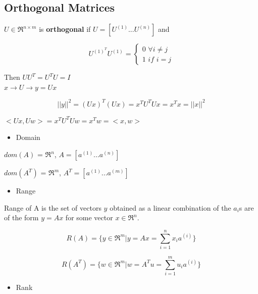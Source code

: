 \subsection{Orthogonal Matrices}

\begin{definition}
	$U\in \Re^{n\times m}$ is \textbf{orthogonal} if $U = [U^{(1)} ... U^{(n)}]$
	and 
	
	$$ U^{(1)^T}U^{(1)}=\left\{
	\begin{aligned}
	0\,\, \forall i\neq j \\
	1\,\, if \,\, i = j
	\end{aligned}
	\right.
	$$
\end{definition}

Then $UU^T = U^TU = I$\\


$x\rightarrow U \rightarrow y = Ux$

\begin{equation*}
||y||^2 = (Ux)^T(Ux) = x^TU^TUx = x^Tx = ||x||^2
\end{equation*}

$<Ux, Uw> = x^TU^TUw = x^Tw = <x, w>$

\begin{itemize}
	\item Domain
\end{itemize}

$dom(A)$ = $\Re^n$, $A = [a^{(1)}...a^{(n)}]$

$dom(A^T)$ = $\Re^m$, $A^T = [a^{(1)}...a^{(m)}]$


\begin{itemize}
	\item Range
\end{itemize}

Range of A is the set of vectors $y$ obtained as a linear combination of the $a_i$s are of the form $y= Ax$ for some vector $x\in \Re^n$.

\begin{equation*}
R(A) = \{y\in \Re^m | y = Ax = \sum^n_{i=1}x_ia^{(i)}\}
\end{equation*}

\begin{equation*}
R(A^T) = \{w\in \Re^m | w = A^Tu = \sum^m_{i=1}u_ia^{(i)}\}
\end{equation*}

\begin{itemize}
	\item Rank
\end{itemize}

